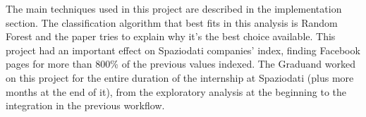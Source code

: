 The main techniques used in this project are described in the implementation section.
The classification algorithm that best fits in this analysis is Random Forest and the paper tries to explain why it's the best choice available.
This project had an important effect on Spaziodati companies' index, finding Facebook pages for more than 800\% of the previous values indexed.
The Graduand worked on this project for the entire duration of the internship at Spaziodati (plus more months at the end of it), from the exploratory analysis at the beginning to the integration in the previous workflow.
%
%





